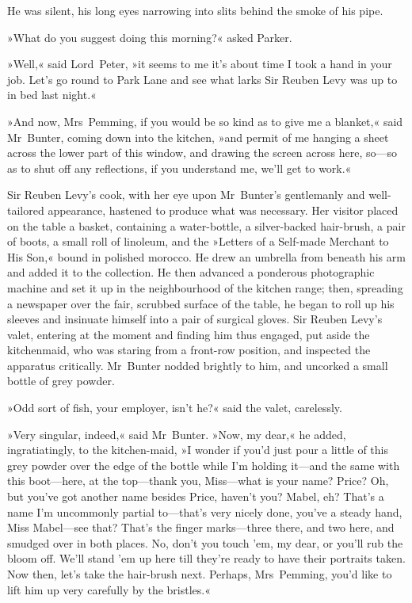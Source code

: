He was silent, his long eyes narrowing into slits behind the smoke of his pipe.

»What do you suggest doing this morning?« asked Parker.

»Well,« said Lord~Peter, »it seems to me it's about time I took a hand in your job. Let's go round to Park Lane and see what larks Sir Reuben Levy was up to in bed last night.«

»And now, Mrs~Pemming, if you would be so kind as to give me a blanket,« said Mr~Bunter, coming down into the kitchen, »and permit of me hanging a sheet across the lower part of this window, and drawing the screen across here, so—so as to shut off any reflections, if you understand me, we'll get to work.«

Sir Reuben Levy's cook, with her eye upon Mr~Bunter's gentlemanly and well-tailored appearance, hastened to produce what was necessary. Her visitor placed on the table a basket, containing a water-bottle, a silver-backed hair-brush, a pair of boots, a small roll of linoleum, and the »Letters of a Self-made Merchant to His Son,« bound in polished morocco. He drew an umbrella from beneath his arm and added it to the collection. He then advanced a ponderous photographic machine and set it up in the neighbourhood of the kitchen range; then, spreading a newspaper over the fair, scrubbed surface of the table, he began to roll up his sleeves and insinuate himself into a pair of surgical gloves. Sir Reuben Levy's valet, entering at the moment and finding him thus engaged, put aside the kitchenmaid, who was staring from a front-row position, and inspected the apparatus critically. Mr~Bunter nodded brightly to him, and uncorked a small bottle of grey powder.

»Odd sort of fish, your employer, isn't he?« said the valet, carelessly.

»Very singular, indeed,« said Mr~Bunter. »Now, my dear,« he added, ingratiatingly, to the kitchen-maid, »I wonder if you'd just pour a little of this grey powder over the edge of the bottle while I'm holding it—and the same with this boot—here, at the top—thank you, Miss—what is your name? Price? Oh, but you've got another name besides Price, haven't you? Mabel, eh? That's a name I'm uncommonly partial to—that's very nicely done, you've a steady hand, Miss Mabel—see that? That's the finger marks—three there, and two here, and smudged over in both places. No, don't you touch 'em, my dear, or you'll rub the bloom off. We'll stand 'em up here till they're ready to have their portraits taken. Now then, let's take the hair-brush next. Perhaps, Mrs~Pemming, you'd like to lift him up very carefully by the bristles.«

